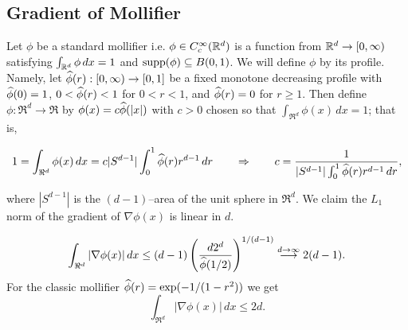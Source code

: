 
\subsection{Gradient of Mollifier}\label{sec:dimension-dep}
Let $\phi$ be a standard mollifier i.e. $\phi\in C_c^\infty(\mathbb{R}^d)$
is a function from $\mathbb{R}^d\to [0,\infty)$ satisfying $\int_{\mathbb{R}^d}
  \phi\,dx = 1$ and $\operatorname{supp}(\phi)\subseteq B(0,1)$.  We will define
  $\phi$ by its profile. Namely, let $\widehat{\phi}(r):[0,\infty)
    \rightarrow [0,1]$ be a fixed monotone decreasing profile with
    $\widehat{\phi}(0)=1$, $0 < \widehat{\phi}(r) < 1$ for $0 < r < 1$, and
    $\widehat{\phi}(r) = 0$ for $r \geq 1$. Then define $\phi:\Re^d
    \rightarrow \Re$ by $\phi(x) = c \widehat{\phi}(|x|)$ with $c > 0$ chosen
    so that $\int_{\Re^d} \phi(x) \, dx = 1$; that is,

\[
1 = \int_{\Re^d} \phi(x) \, dx
= c |S^{d-1}| \int_0^1 \widehat{\phi}(r) r^{d-1} \, dr
\qquad \Rightarrow \qquad
c = \frac{1}{|S^{d-1}| \int_0^1 \widehat{\phi}(r) r^{d-1} \, dr},
\]

where $|S^{d-1}|$ is the $(d-1)$--area of the unit sphere in $\Re^d$.
We claim the $L_1$ norm of the gradient of $\nabla \phi(x)$ is linear in $d$.
\begin{lemma}\label{lem:molli}
  \[
  \int_{\Re^d} |\nabla \phi(x)| \, dx   
\leq (d-1) \left( \frac{d 2^d}{\widehat{\phi}(1/2)} \right)^{1/(d-1)}
\stackrel{d \rightarrow \infty}{\longrightarrow} 2(d-1).
\]
For the classic mollifier $\widehat{\phi}(r)=\exp(-1/(1-r^2))$ we get
  \[
  \int_{\Re^d} |\nabla \phi(x)| \, dx  \leq 2d.
\]
\end{lemma}

